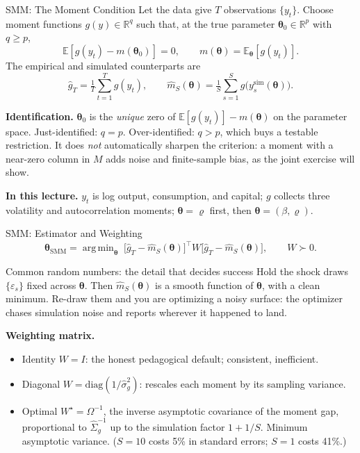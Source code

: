 \documentclass[aspectratio=169,11pt]{beamer}
\newcommand{\emphc}[1]{\textcolor{harvardcrimson}{#1}}
\newcommand{\R}{\mathbb{R}}
\newcommand{\E}[1]{\mathbb{E}\!\left[#1\right]}
\newcommand{\str}{\bm{\theta}}          %
\DeclareMathOperator*{\argmin}{arg\,min}
\begin{document}
\begin{frame}{SMM: The Moment Condition}
\small
Let the data give $T$ observations $\{y_t\}$. Choose moment functions $g(y)\in\R^{q}$ such that, at the true parameter $\str_0 \in \R^{p}$ with $q \ge p$,
\[
\E{g(y_t) - m(\str_0)} = 0,
\qquad m(\str) = \mathbb{E}_{\str}[g(y_t)] .
\]
The empirical and simulated counterparts are
\[
\widehat g_T = \tfrac{1}{T}\sum_{t=1}^{T} g(y_t),
\qquad
\widehat m_S(\str) = \tfrac{1}{S}\sum_{s=1}^{S} g\bigl(y^{\mathrm{sim}}_s(\str)\bigr).
\]

\vspace{0.2em}
\textbf{Identification.} $\str_0$ is the \emph{unique} zero of $\E{g(y_t)} - m(\str)$ on the parameter space. Just-identified: $q = p$. Over-identified: $q > p$, which buys a testable restriction. It does \emph{not} automatically sharpen the criterion: a moment with a near-zero column in $M$ adds noise and finite-sample bias, as the joint exercise will show.

\vspace{0.2em}
\textbf{In this lecture.} $y_t$ is log output, consumption, and capital; $g$ collects three volatility and autocorrelation moments; $\str = \varrho$ first, then $\str = (\beta,\varrho)$.
\end{frame}

\begin{frame}{SMM: Estimator and Weighting}
\small
\[
\widehat{\str}_{\mathrm{SMM}} = \argmin_{\str}\;
\bigl[\widehat g_T - \widehat m_S(\str)\bigr]^{\!\top} W \bigl[\widehat g_T - \widehat m_S(\str)\bigr],
\qquad W \succ 0 .
\]

\vspace{0.3em}
\begin{alertblock}{Common random numbers: the detail that decides success}
Hold the shock draws $\{\varepsilon_s\}$ \emphc{fixed across $\str$}. Then $\widehat m_S(\str)$ is a smooth function of $\str$, with a clean minimum. Re-draw them and you are optimizing a noisy surface: the optimizer chases simulation noise and reports wherever it happened to land.
\end{alertblock}

\vspace{0.2em}
\textbf{Weighting matrix.}
\begin{itemize}\itemsep1pt
  \item \emphc{Identity} $W = I$: the honest pedagogical default; consistent, inefficient.
  \item \emphc{Diagonal} $W = \mathrm{diag}(1/\hat\sigma_g^2)$: rescales each moment by its sampling variance.
  \item \emphc{Optimal} $W^\star = \Omega^{-1}$, the inverse asymptotic covariance of the moment gap, proportional to $\widehat\Sigma_g^{-1}$ up to the simulation factor $1 + 1/S$. Minimum asymptotic variance. ($S = 10$ costs 5\% in standard errors; $S = 1$ costs 41\%.)
\end{itemize}
\end{frame}
\end{document}
